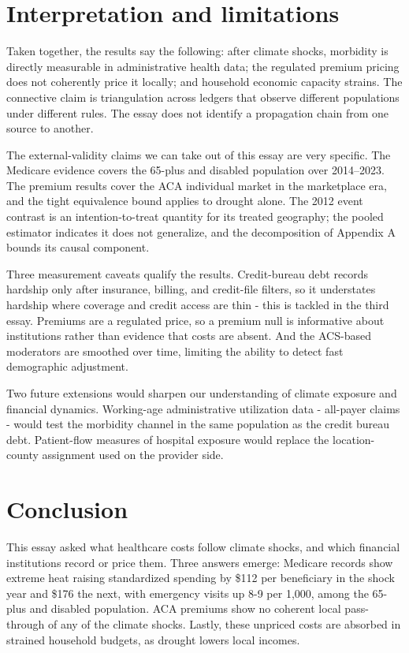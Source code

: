 \documentclass[a4paper,11pt]{report}
\begin{document}
\FloatBarrier
\section{Interpretation and limitations}

Taken together, the results say the following: after climate shocks, morbidity is directly measurable in administrative health data; the regulated premium pricing does not coherently price it locally; and household economic capacity strains. The connective claim is triangulation across ledgers that observe different populations under different rules. The essay does not identify a propagation chain from one source to another.

The external-validity claims we can take out of this essay are very specific. The Medicare evidence covers the 65-plus and disabled population over 2014--2023. The premium results cover the ACA individual market in the marketplace era, and the tight equivalence bound applies to drought alone. The 2012 event contrast is an intention-to-treat quantity for its treated geography; the pooled estimator indicates it does not generalize, and the decomposition of Appendix A bounds its causal component.

Three measurement caveats qualify the results. Credit-bureau debt records hardship only after insurance, billing, and credit-file filters, so it understates hardship where coverage and credit access are thin - this is tackled in the third essay. Premiums are a regulated price, so a premium null is informative about institutions rather than evidence that costs are absent. And the ACS-based moderators are smoothed over time, limiting the ability to detect fast demographic adjustment.

Two future extensions would sharpen our understanding of climate exposure and financial dynamics. Working-age administrative utilization data - all-payer claims - would test the morbidity channel in the same population as the credit bureau debt. Patient-flow measures of hospital exposure would replace the location-county assignment used on the provider side.

\FloatBarrier
\section{Conclusion}

This essay asked what healthcare costs follow climate shocks, and which financial institutions record or price them. Three answers emerge: Medicare records show extreme heat raising standardized spending by \$112 per beneficiary in the shock year and \$176 the next, with emergency visits up 8-9 per 1,000, among the 65-plus and disabled population. ACA premiums show no coherent local pass-through of any of the climate shocks. Lastly, these unpriced costs are absorbed in strained household budgets, as drought lowers local incomes.
\end{document}
